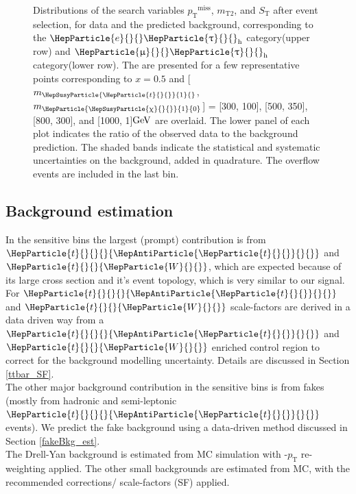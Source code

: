 \documentclass[12pt, a4paper]{article}
\newcommand{\pt}{\ensuremath{p_{\mathrm{T}}}\xspace}
\newcommand{\ptmiss}{\ensuremath{\pt^\text{miss}}}
\newcommand{\mTii}{\ensuremath{m_{\mathrm{T2}}}\xspace}
\newcommand{\ST}{\ensuremath{S_{\mathrm{T}}}\xspace}
\newcommand{\GeV}{\ensuremath{\text{Ge\hspace{-.08em}V}}{}\xspace}
\DeclareRobustCommand{\PW}{{\HepParticle{W}{}{}}\xspace}
\DeclareRobustCommand{\PZ}{{\HepParticle{Z}{}{}}\xspace}
\DeclareRobustCommand{\PQt}{\HepParticle{t}{}{}} %
\DeclareRobustCommand{\PAQt}{{\HepAntiParticle{\PQt}{}{}}\xspace} %
\DeclareRobustCommand{\Pe}{{\HepParticle{e}{}{}}\xspace} %
\DeclareRobustCommand{\PGm}{{\HepParticle{\upmu}{}{}}\xspace} %
\DeclareRobustCommand{\PGt}{{\HepParticle{\uptau}{}{}}\xspace} %
\DeclareRobustCommand{\PSQtDo}{{\HepSusyParticle{\PQt}{1}{}}\xspace}
\DeclareRobustCommand{\PSGc}{{\HepSusyParticle{\upchi}{}{}}\xspace} %
\DeclareRobustCommand{\PSGczDo}{{\HepParticle{\PSGc}{1}{0}}\xspace}
\newcommand{\ttbar}{\PQt{}\PAQt} %
\newcommand{\tauh}{\ensuremath{\PGt_\mathrm{h}}\xspace}
\begin{document}
\begin{figure}[htb!]
	\caption{
		Distributions of the search variables \ptmiss, \mTii,
		and \ST after event selection, for data and the predicted background, corresponding to the $\Pe\tauh$ category(upper row) and $\PGm\tauh$ category(lower row).
		The are presented for a few representative points corresponding to $ x = 0.5 $ and [$ m_{\PSQtDo} $, $ m_{\PSGczDo} $] = [300, 100], [500, 350], [800, 300], and [1000, 1]\GeV are overlaid.
		The lower panel of each plot indicates the ratio of the observed data to the background prediction.
		The shaded bands indicate the statistical and systematic uncertainties on the background, added in quadrature. The overflow events are included in the last bin.
	}
	\label{fig:data_mc_comp}
\end{figure}

\subsection{Background estimation}
In the sensitive bins the largest (prompt) contribution is from $\ttbar$ and $\PQt\PW$, which are expected because of its large cross section and it's event topology, which is very similar to our signal. For $\ttbar$ and $\PQt\PW$ scale-factors are derived in a data driven way from a $\ttbar$ and $\PQt\PW$ enriched control region to correct for the background modelling uncertainty. Details are discussed in Section \ref{ttbar_SF}.\\
The other major background contribution in the sensitive bins is from fakes (mostly from hadronic and semi-leptonic $\ttbar$ events). We predict the fake background using a data-driven method discussed in Section \ref{fakeBkg_est}.\\
The Drell-Yan background is estimated from MC simulation with \PZ-$\pt$ re-weighting applied. The other small backgrounds are estimated from MC, with the recommended corrections/ scale-factors (SF) applied.
\end{document}
